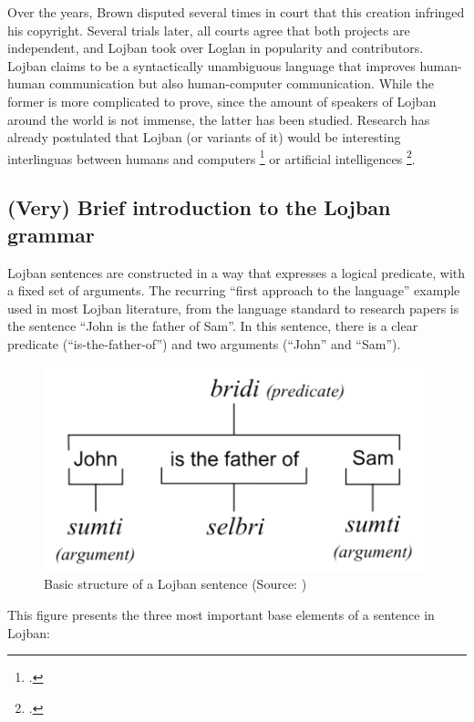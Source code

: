 Over the years, Brown disputed several times in court that this creation infringed his copyright. Several trials later, all courts agree that both projects
are independent, and Lojban took over Loglan in popularity and contributors.\\

Lojban claims to be a syntactically unambiguous language that improves human-human communication but also human-computer
communication. While the former is more complicated to prove, since the amount of speakers of Lojban around the world is not immense,
the latter has been studied. Research has already postulated that Lojban (or variants of it) would be interesting interlinguas between
humans and computers \footcite{speer2004meeting} or artificial intelligences \footcite{goertzel2013lojban}.

\subsection{(Very) Brief introduction to the Lojban grammar}
\label{subsec:brief-intro-to-lojban}

Lojban sentences are constructed in a way that expresses a logical predicate, with a fixed set of arguments.
The recurring ``first approach to the language'' example used in most Lojban literature, from the language standard
to research papers is the sentence ``John is the father of Sam''. In this sentence, there is a clear predicate
(``is-the-father-of'') and two arguments (``John'' and ``Sam'').

\begin{figure}[H]
\centering
\includegraphics[scale=0.20]{images/lojban_grammar.png}
\caption{Basic structure of a Lojban sentence (Source: \cite{cowan1997complete})}
\end{figure}

This figure presents the three most important base elements of a sentence in Lojban:

